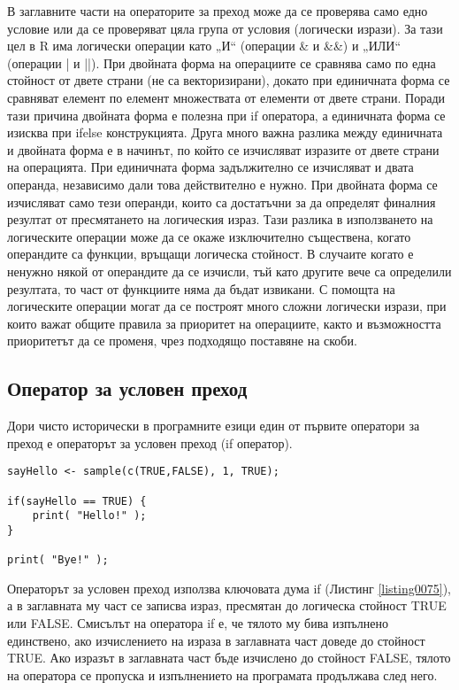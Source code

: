 В заглавните части на операторите за преход може да се проверява само едно условие или да се проверяват цяла група от условия (логически изрази). За тази цел в R има логически операции като „И“ (операции \& и \&\&) и „ИЛИ“ (операции | и ||). При двойната форма на операциите се сравнява само по една стойност от двете страни (не са векторизирани), докато при единичната форма се сравняват елемент по елемент  множествата от елементи от двете страни. Поради тази причина двойната форма е полезна при if оператора, а единичната форма се изисква при ifelse конструкцията. Друга много важна разлика между единичната и двойната форма е в начинът, по който се изчисляват изразите от двете страни на операцията. При единичната форма задължително се изчисляват и двата операнда, независимо дали това действително е нужно. При двойната форма се изчисляват само тези операнди, които са достатъчни за да определят финалния резултат от пресмятането на логическия израз. Тази разлика в използването на логическите операции може да се окаже изключително съществена, когато операндите са функции, връщащи логическа стойност. В случаите когато е ненужно някой от операндите да се изчисли, тъй като другите вече са определили резултата, то част от функциите няма да бъдат извикани. С помощта на логическите операции могат да се построят много сложни логически изрази, при които важат общите правила за приоритет на операциите, както и възможността приоритетът да се променя, чрез подходящо поставяне на скоби.

\subsection{Оператор за условен преход}

Дори чисто исторически в програмните езици един от първите оператори за преход е операторът за условен преход (if оператор).

\begin{lstlisting}[caption=Оператор за условен преход if, label=listing0075]
sayHello <- sample(c(TRUE,FALSE), 1, TRUE);

if(sayHello == TRUE) {
	print( "Hello!" );
}

print( "Bye!" );
\end{lstlisting}

Операторът за условен преход използва ключовата дума if (Листинг \ref{listing0075}), а в заглавната му част се записва израз, пресмятан до логическа стойност TRUE или FALSE. Смисълът на оператора if е, че тялото му бива изпълнено единствено, ако изчислението на израза в заглавната част доведе до стойност TRUE. Ако изразът в заглавната част бъде изчислено до стойност FALSE, тялото на оператора се пропуска и изпълнението на програмата продължава след него.

